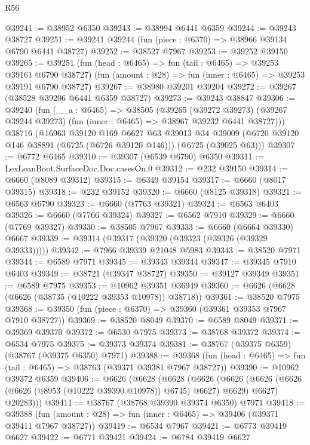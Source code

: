 \begin{lexlean}{R56}
\begin{coremodule}
@39241 := @38952 @6350
@39243 := @38994 @6441 @6359
@39244 := @39243 @38727
@39251 := @39241 @39244 (fun (piece : @6370) => @38966 @39134 @6790 @6441 @38727)
@39252 := @38527 @7967
@39253 := @39252 @39150
@39265 := @39251
    (fun (head : @6465) => fun (tail : @6465) => @39253 @39161 @6790 @38727)
    (fun (amount : @28) => fun (inner : @6465) => @39253 @39191 @6790 @38727)
@39267 := @38980 @39201 @39204
@39272 := @39267 (@38528 @39206 @6441 @6359 @38727)
@39273 := @39243 @38847
@39306 := @39240
    (fun (__a : @6465) =>
    @38505
      (@39265
        (@39272 @39273)
        (@39267 @39244 @39273)
        (fun (inner : @6465) => @38967 @39232 @6441 @38727)))
    @38716
    (@16963
      @39120
      @169
      @6627
      @63
      @39013
      @34
      @39009
      (@6720 @39120 @146 @38891 (@6725 (@6726 @39120 @146)))
      (@6725 (@39025 @63)))
@39307 := @6772 @6465
@39310 := @39307 (@6539 @6790) @6350
@39311 := LexLeanBoot.SurfaceDoc.Doc.casesOn.{0}
@39312 := @232 @39150
@39314 := @6660 (@8089 @39312)
@39315 := @6349 @39154
@39317 := @6660 (@8017 @39315)
@39318 := @232 @39152
@39320 := @6660 (@8125 @39318)
@39321 := @6563 @6790
@39323 := @6660 (@7763 @39321)
@39324 := @6563 @6403
@39326 := @6660 (@7766 @39324)
@39327 := @6562 @7910
@39329 := @6660 (@7769 @39327)
@39330 := @38505 @7967
@39333 := @6660 (@6664 @39330) @6667
@39339 := @39314 (@39317 (@39320 (@39323 (@39326 (@39329 @39333)))))
@39342 := @7966 @39339 @21048 @5983
@39343 := @38520 @7971
@39344 := @6589 @7971
@39345 := @39343 @39344
@39347 := @39345 @7910 @6403
@39349 := @38721 (@39347 @38727)
@39350 := @39127 @39349
@39351 := @6589 @7975
@39353 := @10962 @39351 @36949
@39360 := @6626 (@6628 (@6626 (@38735 (@10222 @39353 @10978)) @38718))
@39361 := @38520 @7975
@39368 := @39350 (fun (piece : @6370) => @39360 (@39361 @39353 @7967 @7910 @38727))
@39369 := @38520 @8049
@39370 := @6589 @8049
@39371 := @39369 @39370
@39372 := @6530 @7975
@39373 := @38768 @39372
@39374 := @6534 @7975
@39375 := @39373 @39374
@39381 := @38767 (@39375 @6359) (@38767 (@39375 @6350) @7971)
@39388 := @39368 (fun (head : @6465) => fun (tail : @6465) => @38763 (@39371 @39381 @7967 @38727))
@39390 := @10962 @39372 @6359
@39406 := @6626
    (@6628
      (@6628
        (@6626
          (@6626 (@6626 (@6626 (@6626 (@8953 (@10222 @39390 @10978)) @6745) @6627) @6629) @6627)
          @20283)))
@39411 := @38767 (@38768 @39390 @39374 @6350) @7971
@39418 := @39388 (fun (amount : @28) => fun (inner : @6465) => @39406 (@39371 @39411 @7967 @38727))
@39419 := @6534 @7967
@39421 := @6773 @39419 @6627
@39422 := @6771 @39421
@39424 := @6784 @39419 @6627

\end{coremodule}
\end{lexlean}
